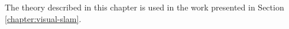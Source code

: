 \begin{comment}
\paragraph{Particle Filter}
The key idea of the \textit{Particle Filter}  is to represent the posterior $bel(x_t)$ by a set of random state particles (samples) drawn from this posterior.
This representation is approximate, but can represent a much broader space of discributions than the single-hypothesis trackers.
Another advantage is that the transformations are not limited to linear functions anymore.

The particles (samples) are denoted
\begin{equation}
\chi = x_t^{[1]}, x_t^{[2]}, \hdots, x_t^{[M]}
\end{equation}
Each particle $x_t^{[m]}$ is a state hypothesis at time $t$.
Ideally, the likelihood for a state hypothesis $x_t$ to be in $\chi$, should be proportional to $bel(x_t)$.
The denser a subregion of the space is populated with particles, the more likely it is that the true state falls into this region.
In the prediction step, the motion model is applied to each particle $x_{t-1}^{[m]}$ to generate a prediction $x_t^{[m]}$.
When observation $z_t$ is made, the \textit{importance factor} $w_t^{[m]}$ is computed.
\begin{equation}
w_t^{[m]} = p ( z_t | x_t^{[m]}, z_{0 \to t-1})
\end{equation}
The final step of the particle filter is {resampling}, in which the current set of particles re-sampled based on the computed likelihoods.
The algorithm draws with replacement $M$ particles from the temporary set $\overline{\chi}_t$.
The probability of each particle is given by its importance weights.
This changes the distribution of the particle from $\overline{bel}(x_t)$ to $bel(x_t)$.

Particle filters overcome the limitations of using a Gaussian to represent a probability distribution.
With sufficient samples, they approach the Bayesian optimal estimate, so they can be made more accurate than either the EKF or UKF.
The increased representational power of particle filters comes at the cost of higher computational complexity.
And, when the number of particles is insufficient, the particle filter might suffer from sample impoverishment.
\end{comment}

The theory described in this chapter is used in the work presented in Section \ref{chapter:visual-slam}.
